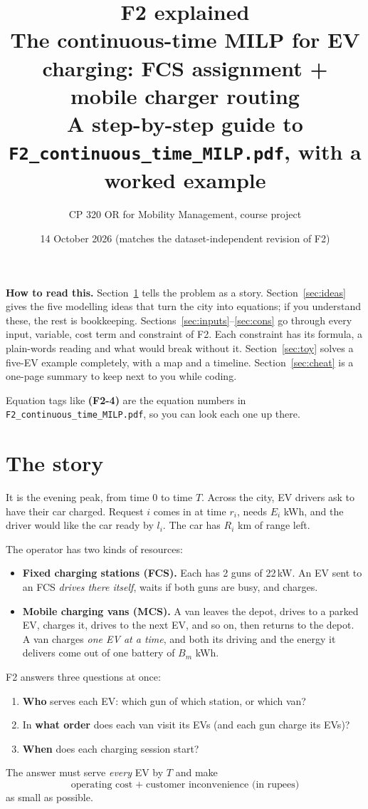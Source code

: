 \documentclass[11pt,a4paper]{article}
\title{\textbf{F2 explained}\\[3pt]
\large The continuous-time MILP for EV charging: FCS assignment + mobile charger routing\\[2pt]
\normalsize A step-by-step guide to \texttt{F2\_continuous\_time\_MILP.pdf}, with a worked example}
\author{CP 320 OR for Mobility Management, course project}
\date{14 October 2026 (matches the dataset-independent revision of F2)}
\begin{document}
\maketitle

\textbf{How to read this.} Section~\ref{sec:story} tells the problem as a story. Section~\ref{sec:ideas} gives the five modelling ideas that turn the city into equations; if you understand these, the rest is bookkeeping. Sections~\ref{sec:inputs}--\ref{sec:cons} go through every input, variable, cost term and constraint of F2. Each constraint has its formula, a plain-words reading and what would break without it. Section~\ref{sec:toy} solves a five-EV example completely, with a map and a timeline. Section~\ref{sec:cheat} is a one-page summary to keep next to you while coding.

Equation tags like \textbf{(F2-4)} are the equation numbers in \texttt{F2\_continuous\_time\_MILP.pdf}, so you can look each one up there.

\tableofcontents
\newpage

\section{The story}\label{sec:story}

It is the evening peak, from time $0$ to time $T$. Across the city, EV drivers ask to have their car charged. Request $i$ comes in at time $r_i$, needs $E_i$ kWh, and the driver would like the car ready by $l_i$. The car has $R_i$ km of range left.

The operator has two kinds of resources:
\begin{itemize}[leftmargin=1.4em,itemsep=2pt]
  \item \textbf{Fixed charging stations (FCS).} Each has 2 guns of 22\,kW. An EV sent to an FCS \emph{drives there itself}, waits if both guns are busy, and charges.
  \item \textbf{Mobile charging vans (MCS).} A van leaves the depot, drives to a parked EV, charges it, drives to the next EV, and so on, then returns to the depot. A van charges \emph{one EV at a time}, and both its driving and the energy it delivers come out of one battery of $B_m$ kWh.
\end{itemize}

F2 answers three questions at once:
\begin{enumerate}[leftmargin=1.6em,itemsep=2pt]
  \item \textbf{Who} serves each EV: which gun of which station, or which van?
  \item In \textbf{what order} does each van visit its EVs (and each gun charge its EVs)?
  \item \textbf{When} does each charging session start?
\end{enumerate}
The answer must serve \emph{every} EV by $T$ and make
\[
\text{operating cost} \;+\; \text{customer inconvenience (in rupees)}
\]
as small as possible.
\end{document}
